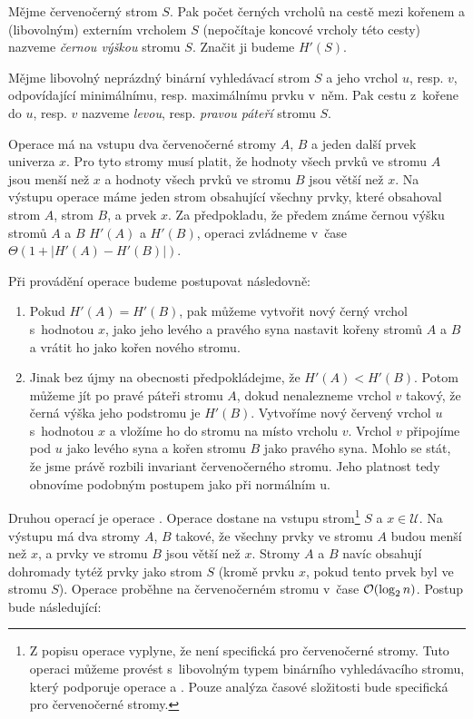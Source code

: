 \begin{definice}
Mějme červenočerný strom $S$. Pak počet černých vrcholů na cestě mezi kořenem a (libovolným) externím vrcholem $S$ (nepočítaje koncové vrcholy této cesty) nazveme \emph{černou výškou} stromu $S$. Značit ji budeme $H'(S)$.
\end{definice}


\begin{definice}
Mějme libovolný neprázdný binární vyhledávací strom $S$ a jeho vrchol $u$, resp. $v$, odpovídající minimálnímu, resp. maximálnímu prvku v~něm. Pak cestu z~kořene do $u$, resp. $v$ nazveme \emph{levou}, resp. \emph{pravou páteří} stromu $S$.
\end{definice}

Operace  má na vstupu dva červenočerné
stromy $A$, $B$ a jeden další prvek univerza $x$. Pro tyto stromy musí platit,
že hodnoty všech prvků ve stromu $A$ jsou menší než $x$ a hodnoty všech prvků
ve stromu $B$ jsou větší než $x$. Na výstupu operace  máme jeden strom
obsahující všechny prvky, které obsahoval strom $A$, strom $B$, a prvek $x$. Za
předpokladu, že předem známe černou výšku stromů $A$
a $B$ $H'(A)$ a $H'(B)$, operaci  zvládneme v~čase $\Theta(1+|H'(A) -
H'(B)|)$.

Při provádění operace  budeme postupovat následovně:

\begin{enumerate}
\item Pokud $H'(A) = H'(B)$, pak můžeme vytvořit nový černý vrchol s~hodnotou $x$, jako jeho levého a pravého syna nastavit kořeny stromů $A$ a $B$ a vrátit ho jako kořen nového stromu.
\item Jinak bez újmy na obecnosti předpokládejme, že $H'(A)<H'(B)$. Potom můžeme jít po pravé páteři stromu $A$, dokud nenalezneme vrchol $v$ takový, že černá výška jeho podstromu je $H'(B)$. Vytvoříme nový červený vrchol $u$ s~hodnotou $x$ a vložíme ho do stromu na místo vrcholu $v$. Vrchol $v$ připojíme pod $u$ jako levého syna a kořen stromu $B$ jako pravého syna. Mohlo se stát, že jsme právě rozbili invariant červenočerného stromu. Jeho platnost tedy obnovíme podobným postupem jako při normálním u.
\end{enumerate}

Druhou operací je operace . Operace  dostane na vstupu
strom\footnote{Z popisu operace  vyplyne, že není specifická pro
červenočerné stromy. Tuto operaci můžeme provést s~libovolným typem binárního
vyhledávacího stromu, který podporuje operace  a . Pouze
analýza časové složitosti bude specifická pro červenočerné stromy.} $S$ a $x\in
\mathcal U$. Na výstupu má dva stromy $A$, $B$ takové, že všechny prvky ve
stromu $A$ budou menší než $x$, a prvky ve stromu $B$ jsou větší než $x$.
Stromy $A$ a $B$ navíc obsahují dohromady tytéž prvky jako strom $S$ (kromě
prvku $x$, pokud tento prvek byl ve stromu $S$). Operace  proběhne
na červenočerném stromu v~čase $\o(\log n)$. Postup bude následující:

